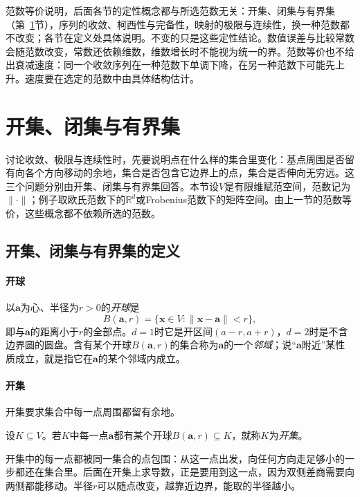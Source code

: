 范数等价说明，后面各节的定性概念都与所选范数无关：开集、闭集与有界集（第~\ref{sec:multivariable-open-closed-sets}节），序列的收敛、柯西性与完备性，映射的极限与连续性，换一种范数都不改变；各节在定义处具体说明。不变的只是这些定性结论。数值误差与比较常数会随范数改变，常数还依赖维数，维数增长时不能视为统一的界。范数等价也不给出衰减速度：同一个收敛序列在一种范数下单调下降，在另一种范数下可能先上升。速度要在选定的范数中由具体结构估计。

\section{开集、闭集与有界集}
\label{sec:multivariable-open-closed-sets}

讨论收敛、极限与连续性时，先要说明点在什么样的集合里变化：基点周围是否留有向各个方向移动的余地，集合是否包含它边界上的点，集合是否伸向无穷远。这三个问题分别由开集、闭集与有界集回答。本节设$V$是有限维赋范空间，范数记为$\lVert\cdot\rVert$；例子取欧氏范数下的$\mathbb R^d$或Frobenius范数下的矩阵空间。由上一节的范数等价，这些概念都不依赖所选的范数。

\subsection{开集、闭集与有界集的定义}
\label{sec:multivariable-open-closed-definitions}

\paragraph{开球}
以$\bm a$为心、半径为$r>0$的\emph{开球}是
\[
 B(\bm a,r)=\{\bm x\in V:\lVert\bm x-\bm a\rVert<r\},
\]
即与$\bm a$的距离小于$r$的全部点。$d=1$时它是开区间$(a-r,a+r)$，$d=2$时是不含边界圆的圆盘。含有某个开球$B(\bm a,r)$的集合称为$\bm a$的一个\emph{邻域}；说“$\bm a$附近”某性质成立，就是指它在$\bm a$的某个邻域内成立。

\paragraph{开集}
开集要求集合中每一点周围都留有余地。
\begin{definition}[开集]
\label{def:multivariable-open-closed-bounded}
设$K\subseteq V$。若$K$中每一点$\bm a$都有某个开球$B(\bm a,r)\subseteq K$，就称$K$为\emph{开集}。
\end{definition}
开集中的每一点都被同一集合的点包围：从这一点出发，向任何方向走足够小的一步都还在集合里。后面在开集上求导数，正是要用到这一点，因为双侧差商需要向两侧都能移动。半径$r$可以随点改变，越靠近边界，能取的半径越小。

